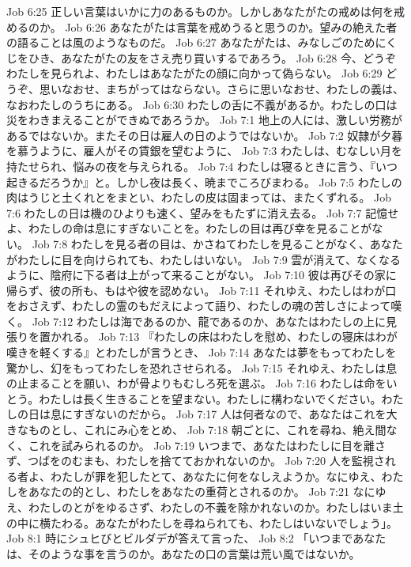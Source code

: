 Job 6:25  正しい言葉はいかに力のあるものか。しかしあなたがたの戒めは何を戒めるのか。
Job 6:26  あなたがたは言葉を戒めうると思うのか。望みの絶えた者の語ることは風のようなものだ。
Job 6:27  あなたがたは、みなしごのためにくじをひき、あなたがたの友をさえ売り買いするであろう。
Job 6:28  今、どうぞわたしを見られよ、わたしはあなたがたの顔に向かって偽らない。
Job 6:29  どうぞ、思いなおせ、まちがってはならない。さらに思いなおせ、わたしの義は、なおわたしのうちにある。
Job 6:30  わたしの舌に不義があるか。わたしの口は災をわきまえることができぬであろうか。
Job 7:1  地上の人には、激しい労務があるではないか。またその日は雇人の日のようではないか。
Job 7:2  奴隷が夕暮を慕うように、雇人がその賃銀を望むように、
Job 7:3  わたしは、むなしい月を持たせられ、悩みの夜を与えられる。
Job 7:4  わたしは寝るときに言う、『いつ起きるだろうか』と。しかし夜は長く、暁までころびまわる。
Job 7:5  わたしの肉はうじと土くれとをまとい、わたしの皮は固まっては、またくずれる。
Job 7:6  わたしの日は機のひよりも速く、望みをもたずに消え去る。
Job 7:7  記憶せよ、わたしの命は息にすぎないことを。わたしの目は再び幸を見ることがない。
Job 7:8  わたしを見る者の目は、かさねてわたしを見ることがなく、あなたがわたしに目を向けられても、わたしはいない。
Job 7:9  雲が消えて、なくなるように、陰府に下る者は上がって来ることがない。
Job 7:10  彼は再びその家に帰らず、彼の所も、もはや彼を認めない。
Job 7:11  それゆえ、わたしはわが口をおさえず、わたしの霊のもだえによって語り、わたしの魂の苦しさによって嘆く。
Job 7:12  わたしは海であるのか、龍であるのか、あなたはわたしの上に見張りを置かれる。
Job 7:13  『わたしの床はわたしを慰め、わたしの寝床はわが嘆きを軽くする』とわたしが言うとき、
Job 7:14  あなたは夢をもってわたしを驚かし、幻をもってわたしを恐れさせられる。
Job 7:15  それゆえ、わたしは息の止まることを願い、わが骨よりもむしろ死を選ぶ。
Job 7:16  わたしは命をいとう。わたしは長く生きることを望まない。わたしに構わないでください。わたしの日は息にすぎないのだから。
Job 7:17  人は何者なので、あなたはこれを大きなものとし、これにみ心をとめ、
Job 7:18  朝ごとに、これを尋ね、絶え間なく、これを試みられるのか。
Job 7:19  いつまで、あなたはわたしに目を離さず、つばをのむまも、わたしを捨てておかれないのか。
Job 7:20  人を監視される者よ、わたしが罪を犯したとて、あなたに何をなしえようか。なにゆえ、わたしをあなたの的とし、わたしをあなたの重荷とされるのか。
Job 7:21  なにゆえ、わたしのとがをゆるさず、わたしの不義を除かれないのか。わたしはいま土の中に横たわる。あなたがわたしを尋ねられても、わたしはいないでしょう」。
Job 8:1  時にシュヒびとビルダデが答えて言った、
Job 8:2  「いつまであなたは、そのような事を言うのか。あなたの口の言葉は荒い風ではないか。
